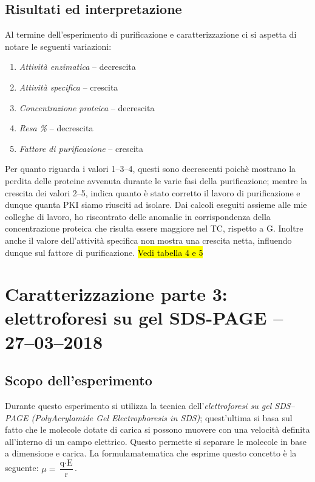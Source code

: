 \documentclass[twocolumn,a4paper,10pt]{my_report}
\begin{document}
{\subsection*{Risultati ed interpretazione}
Al termine dell'esperimento di purificazione e caratterizzazione ci si aspetta di notare le seguenti variazioni:
\begin{enumerate}
 \item \emph{Attività enzimatica} -- decrescita
 \item \emph{Attività specifica} -- crescita
 \item \emph{Concentrazione proteica} -- decrescita
 \item \emph{Resa \%} -- decrescita
 \item \emph{Fattore di purificazione} -- crescita
\end{enumerate}

Per quanto riguarda i valori 1--3--4, questi sono decrescenti poichè mostrano la perdita delle proteine avvenuta durante le varie fasi della purificazione; mentre la crescita dei valori 2--5, indica quanto è stato corretto il lavoro di purificazione e dunque quanta PKI siamo riusciti ad isolare.
Dai calcoli eseguiti assieme alle mie colleghe di lavoro, ho riscontrato delle anomalie in corrispondenza della concentrazione proteica che risulta essere maggiore nel TC, rispetto a G.
Inoltre anche il valore dell'attività specifica non mostra una crescita netta, influendo dunque sul fattore di purificazione. \hl{Vedi tabella 4 e 5}

\section*{Caratterizzazione parte 3: elettroforesi su gel SDS-PAGE -- 27--03--2018}

\subsection*{Scopo dell'esperimento}
Durante questo esperimento si utilizza la tecnica dell'\emph{elettroforesi su gel SDS--PAGE (PolyAcrylamide Gel Electrophoresis in SDS)}; quest'ultima si basa sul fatto che le molecole dotate di carica si possono muovere con una velocità definita all'interno di un campo elettrico. Questo permette si separare le molecole in base a dimensione e carica. La formula\footnotemark matematica che esprime questo concetto è la seguente:
$\mu=\dfrac{\text{q}\cdot\text{E}}{\text{r}}$.

}
\end{document}
